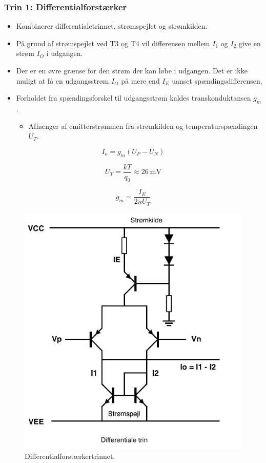 \documentclass[danish]{article}
\begin{document}
\subsubsection{Trin 1: Differentialforstærker}
\begin{itemize}
	\item Kombinerer differentialetrinnet, strømspejlet og strømkilden.
	\item På grund af strømspejlet ved T3 og T4 vil differensen mellem $I_1$ og $I_2$ give en strøm $I_O$ i udgangen.
	\item Der er en øvre grænse for den strøm der kan løbe i udgangen. Det er ikke muligt at få en udgangsstrøm $I_O$ på mere end $I_E$ uanset spændingsdifferensen.
	\item Forholdet fra spændingsforskel til udgangsstrøm kaldes transkonduktansen $g_m$.
	\begin{itemize}
		\item Afhænger af emitterstrømmen fra strømkilden og temperaturspændingen $U_T$.
	\end{itemize} 
\end{itemize}

\begin{equation} 
I_o = g_m(U_P-U_N)
\end{equation}

\begin{equation} 
U_T = \frac{k T}{q_0} \approx \SI{26}{\milli\volt}
\end{equation}

\begin{equation} 
g_m = \frac{I_E}{2nU_T}
\end{equation}

\begin{figure} [H]
	\centering
	\includegraphics[width=0.7\linewidth]{graphics/differentialtrin_fors}
	\caption{Differentialforstærkertrinnet.}
	\label{fig:differentialforstarker}
\end{figure}
\end{document}
